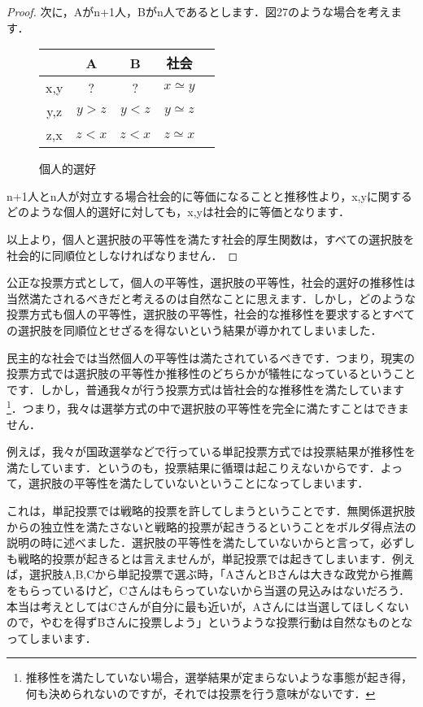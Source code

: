 \begin{proof}
次に，Aがn+1人，Bがn人であるとします．図27のような場合を考えます．
\begin{figure}[!h]
    \centering
    \begin{tabular}[!h]{|c|c|c|c|c|} \hline
         & A & B & 社会 \\ \hline
        x,y &    ?    &    ?    & $x \simeq y$ \\ \hline
        y,z & $y > z$ & $y < z$ & $y \simeq z$ \\ \hline
        z,x & $z < x$ & $z < x$ & $z \simeq x$ \\ \hline
    \end{tabular}
    \caption{個人的選好}
\end{figure}
n+1人とn人が対立する場合社会的に等価になることと推移性より，x,yに関するどのような個人的選好に対しても，x,yは社会的に等価となります．

以上より，個人と選択肢の平等性を満たす社会的厚生関数は，すべての選択肢を社会的に同順位としなければなりません．
\end{proof}

公正な投票方式として，個人の平等性，選択肢の平等性，社会的選好の推移性は当然満たされるべきだと考えるのは自然なことに思えます．しかし，どのような投票方式も個人の平等性，選択肢の平等性，社会的な推移性を要求するとすべての選択肢を同順位とせざるを得ないという結果が導かれてしまいました．

民主的な社会では当然個人の平等性は満たされているべきです．つまり，現実の投票方式では選択肢の平等性か推移性のどちらかが犠牲になっているということです．しかし，普通我々が行う投票方式は皆社会的な推移性を満たしています\footnote{推移性を満たしていない場合，選挙結果が定まらないような事態が起き得，何も決められないのですが，それでは投票を行う意味がないです．}．つまり，我々は選挙方式の中で選択肢の平等性を完全に満たすことはできません．

例えば，我々が国政選挙などで行っている単記投票方式では投票結果が推移性を満たしています．というのも，投票結果に循環は起こりえないからです．よって，選択肢の平等性を満たしていないということになってしまいます．

これは，単記投票では戦略的投票を許してしまうということです．無関係選択肢からの独立性を満たさないと戦略的投票が起きうるということをボルダ得点法の説明の時に述べました．選択肢の平等性を満たしていないからと言って，必ずしも戦略的投票が起きるとは言えませんが，単記投票では起きてしまいます．例えば，選択肢A,B,Cから単記投票で選ぶ時，「AさんとBさんは大きな政党から推薦をもらっているけど，Cさんはもらっていないから当選の見込みはないだろう．本当は考えとしてはCさんが自分に最も近いが，Aさんには当選してほしくないので，やむを得ずBさんに投票しよう」というような投票行動は自然なものとなってしまいます．

